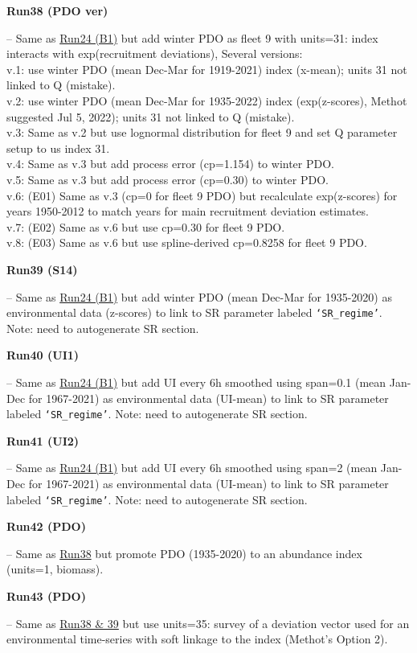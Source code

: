 \hypertarget{R38}{\textbf{Run38 (PDO ver)}} -- Same as \hyperlink{R24}{Run24 (B1)} but add winter PDO as fleet 9 with units=31: index interacts with exp(recruitment deviations),  Several versions:\\
v.1: use winter PDO (mean Dec-Mar for 1919-2021) index (x-mean); units 31 not linked to Q (mistake).\\
v.2: use winter PDO (mean Dec-Mar for 1935-2022) index (exp(z-scores), Methot suggested Jul 5, 2022); units 31 not linked to Q (mistake).\\
v.3: Same as v.2 but use lognormal distribution for fleet 9 and set Q parameter setup to us index 31.\\
v.4: Same as v.3 but add process error (cp=1.154) to winter PDO.\\
v.5: Same as v.3 but add process error (cp=0.30) to winter PDO.\\
v.6: (E01) Same as v.3 (cp=0 for fleet 9 PDO) but recalculate exp(z-scores) for years 1950-2012 to match years for main recruitment deviation estimates.\\
v.7: (E02) Same as v.6 but use cp=0.30 for fleet 9 PDO.\\
v.8: (E03) Same as v.6 but use spline-derived cp=0.8258 for fleet 9 PDO.

\hypertarget{R39}{\textbf{Run39 (S14)}} -- Same as \hyperlink{R24}{Run24 (B1)} but add winter PDO (mean Dec-Mar for 1935-2020) as environmental data (z-scores) to link to SR parameter labeled \texttt{`SR\_regime'}. Note: need to autogenerate SR section.

\hypertarget{R40}{\textbf{Run40 (UI1)}} -- Same as \hyperlink{R24}{Run24 (B1)} but add UI every 6h smoothed using span=0.1 (mean Jan-Dec for 1967-2021) as environmental data (UI-mean) to link to SR parameter labeled \texttt{`SR\_regime'}. Note: need to autogenerate SR section.

\hypertarget{R41}{\textbf{Run41 (UI2)}} -- Same as \hyperlink{R24}{Run24 (B1)} but add UI every 6h smoothed using span=2 (mean Jan-Dec for 1967-2021) as environmental data (UI-mean) to link to SR parameter labeled \texttt{`SR\_regime'}. Note: need to autogenerate SR section.

\hypertarget{R42}{\textbf{Run42 (PDO)}} -- Same as \hyperlink{R38}{Run38} but promote PDO (1935-2020) to an abundance index (units=1, biomass).

\hypertarget{R43}{\textbf{Run43 (PDO)}} -- Same as \hyperlink{R38}{Run38 \& 39} but use units=35: survey of a deviation vector used for an environmental time-series with soft linkage to the index (Methot's Option 2).

